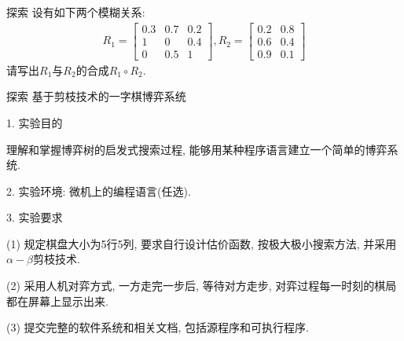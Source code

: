 \begin{custom}[explorecolor]{探索}
设有如下两个模糊关系:
\begin{align*}
R_{1}=\left[
\begin{array}{ccc}{0.3} & {0.7} & {0.2} \\ {1} & {0} & {0.4} \\ {0} & {0.5} & {1}\end{array}\right],
R_{2}=\left[\begin{array}{cc}{0.2} & {0.8} \\ {0.6} & {0.4} \\ {0.9} & {0.1}\end{array}\right]
\end{align*}请写出$R_1$与$R_2$的合成$R_1\circ R_2$.
\end{custom}
\begin{custom}[explorecolor]{探索}
基于剪枝技术的一字棋博弈系统

    1. 实验目的

    理解和掌握博弈树的启发式搜索过程, 能够用某种程序语言建立一个简单的博弈系统.

    2. 实验环境: 微机上的编程语言(任选).

    3. 实验要求

    (1) 规定棋盘大小为5行5列, 要求自行设计估价函数, 按极大极小搜索方法, 并采用$\alpha-\beta$剪枝技术.

    (2) 采用人机对弈方式, 一方走完一步后, 等待对方走步, 对弈过程每一时刻的棋局都在屏幕上显示出来.

    (3) 提交完整的软件系统和相关文档, 包括源程序和可执行程序.
\end{custom}

